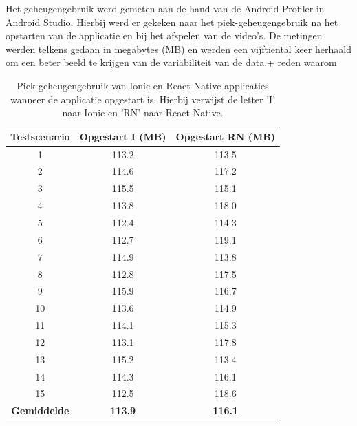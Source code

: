 Het geheugengebruik werd gemeten aan de hand van de Android Profiler in Android Studio. Hierbij werd er gekeken naar het piek-geheugengebruik na het opstarten van de applicatie en bij het afspelen van de video's. De metingen werden telkens gedaan in megabytes (MB) en werden een vijftiental keer herhaald om een beter beeld te krijgen van de variabiliteit van de data.+ reden waarom

\begin{table}[htbp]
  \centering
  \begin{tabular}{|c|c|c|}
      \hline
      \textbf{Testscenario} & \textbf{Opgestart I (MB)} & \textbf{Opgestart RN (MB)} \\
      \hline
      1 & 113.2 & 113.5 \\
      \hline
      2 & 114.6 & 117.2 \\
      \hline
      3 & 115.5 & 115.1 \\
      \hline
      4 & 113.8 & 118.0 \\
      \hline
      5 & 112.4 & 114.3 \\
      \hline
      6 & 112.7 & 119.1 \\
      \hline
      7 & 114.9 & 113.8 \\
      \hline
      8 & 112.8 & 117.5 \\
      \hline
      9 & 115.9 & 116.7 \\
      \hline
      10 & 113.6 & 114.9 \\
      \hline
      11 & 114.1 & 115.3 \\
      \hline
      12 & 113.1 & 117.8 \\
      \hline
      13 & 115.2 & 113.4 \\
      \hline
      14 & 114.3 & 116.1 \\
      \hline
      15 & 112.5 & 118.6 \\
      \hline
      \textbf{Gemiddelde} & \textbf{113.9} & \textbf{116.1} \\
      \hline
  \end{tabular}
  \caption{Piek-geheugengebruik van Ionic en React Native applicaties wanneer de applicatie opgestart is. Hierbij verwijst de letter 'I' naar Ionic en 'RN' naar React Native.}
  \label{tab:memory1}
\end{table}

